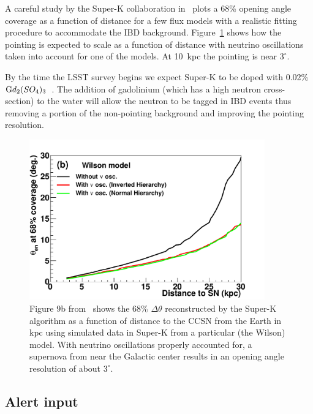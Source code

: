 \documentclass[12pt, letterpaper]{article}
\newcommand{\superk}  {Super\nobreakdash-K\xspace}
\begin{document}
A careful study by the \superk collaboration
in~\cite{2016APh....81...39A} plots a 68\% opening angle coverage as a
function of distance for a few flux models with a realistic fitting
procedure to accommodate the IBD
background. Figure~\ref{fig:SK-realtime-pointing-resolution} shows how
the pointing is expected to scale as a function of distance with
neutrino oscillations taken into account for one of the models. At
10~kpc the pointing is near $3^\circ$.

By the time the LSST survey begins we expect \superk to be doped with
0.02\% $\textrm Gd_2(SO_4)_3$~\cite{2004PhRvL..93q1101B}.  The
addition of gadolinium (which has a high neutron cross-section) to the
water will allow the neutron to be tagged in IBD events thus removing
a portion of the non-pointing background and improving the pointing
resolution.

\begin{figure}
  \begin{center}
    \includegraphics[width=4.0in]{dtheta_dist_wilson_all}
    \caption{Figure 9b from~\cite{2016APh....81...39A} shows the 68\%
      $\Delta \theta$ reconstructed by the Super-K algorithm as a
      function of distance to the CCSN from the Earth in kpc using
      simulated data in Super-K from a particular (the Wilson) model.
      With neutrino oscillations properly accounted for, a supernova
      from near the Galactic center results in an opening angle
      resolution of about $3^\circ$.}
    \label{fig:SK-realtime-pointing-resolution}
  \end{center}
\end{figure}

\subsection{Alert input}
\end{document}
